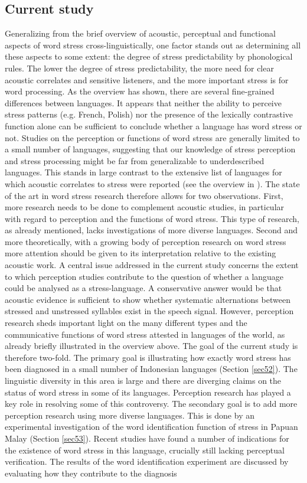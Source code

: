 \subsection{Current study} \label{sec514}
Generalizing from the brief overview of acoustic, perceptual and functional aspects of word stress cross-linguistically, one factor stands out as determining all these aspects to some extent: the degree of stress predictability by phonological rules. The lower the degree of stress predictability, the more need for clear acoustic correlates and sensitive listeners, and the more important stress is for word processing. As the overview has shown, there are several fine-grained differences between languages. It appears that neither the ability to perceive stress patterns (e.g. French, Polish) nor the presence of the lexically contrastive function alone can be sufficient to conclude whether a language has word stress or not. Studies on the perception or functions of word stress are generally limited to a small number of languages, suggesting that our knowledge of stress perception and stress processing might be far from generalizable to underdescribed languages. This stands in large contrast to the extensive list of languages for which acoustic correlates to stress were reported (see the overview in \citealt{gordon_acoustic_2017}). The state of the art in word stress research therefore allows for two observations. First, more research needs to be done to complement acoustic studies, in particular with regard to perception and the functions of word stress. This type of research, as already mentioned, lacks investigations of more diverse languages. Second and more theoretically, with a growing body of perception research on word stress more attention should be given to its interpretation relative to the existing acoustic work. A central issue addressed in the current study concerns the extent to which perception studies contribute to the question of whether a language could be analysed as a stress-language. A conservative answer would be that acoustic evidence is sufficient to show whether systematic alternations between stressed and unstressed syllables exist in the speech signal. However, perception research sheds important light on the many different types and the communicative functions of word stress attested in languages of the world, as already briefly illustrated in the overview above. The goal of the current study is therefore two-fold. The primary goal is illustrating how exactly word stress has been diagnosed in a small number of Indonesian languages (Section \ref{sec52}). The linguistic diversity in this area is large and there are diverging claims on the status of word stress in some of its languages. Perception research has played a key role in resolving some of this controversy. The secondary goal is to add more perception research using more diverse languages. This is done by an experimental investigation of the word identification function of stress in Papuan Malay (Section \ref{sec53}). Recent studies have found a number of indications for the existence of word stress in this language, crucially still lacking perceptual verification. The results of the word identification experiment are discussed by evaluating how they contribute to the diagnosis 